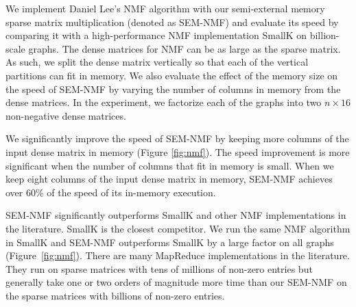 \documentclass[simplex.tex]{subfiles}
\begin{document}

We implement Daniel Lee's NMF algorithm with our semi-external memory
sparse matrix multiplication (denoted as SEM-NMF) and evaluate its
speed by comparing it with a high-performance NMF implementation
SmallK on billion-scale graphs. The dense matrices for NMF can be as
large as the sparse matrix. As such, we split the dense matrix
vertically so that each of the vertical partitions can fit in memory. We
also evaluate the effect of the memory size on the speed of
SEM-NMF by varying the number of columns in memory from the dense
matrices. In the experiment, we factorize each of the graphs
into two $n \times 16$ non-negative dense matrices.


We significantly improve the speed of SEM-NMF by keeping more
columns of the input dense matrix in memory (Figure \ref{fig:nmf}). The
speed improvement is more significant when the number of columns
that fit in memory is small. When we keep eight columns of the input
dense matrix in memory, SEM-NMF achieves over 60\% of the speed of
its in-memory execution.


SEM-NMF significantly outperforms SmallK and other NMF implementations
in the literature. SmallK is the closest competitor. We run the same NMF
algorithm in SmallK and SEM-NMF outperforms SmallK by a large factor on
all graphs (Figure~\ref{fig:nmf}). There are many MapReduce
implementations in the literature. They run on sparse matrices with tens
of millions of non-zero entries but generally take one or two orders of
magnitude more time than our SEM-NMF on the sparse matrices with
billions of non-zero entries.
\end{document}
